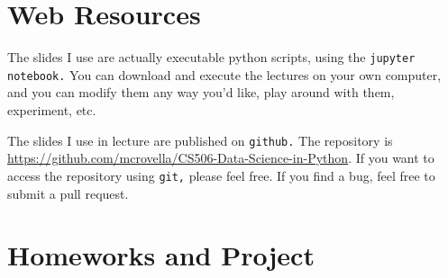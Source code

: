 \documentclass[11pt]{article}
\begin{document}
\section*{Web Resources} 

The slides I use are actually executable python scripts, using the
\texttt{jupyter notebook.}   You can
download and execute the lectures on your own computer, and you can
modify them any way you'd like, play around with them, experiment, etc.

The slides I use in lecture are published on \texttt{github.}   The
repository is
\url{https://github.com/mcrovella/CS506-Data-Science-in-Python}.  If you want
to access the repository using \texttt{git,} please feel free.   If you
find a bug, feel free to submit a pull request.
 
\section*{Homeworks and Project}
\end{document}

